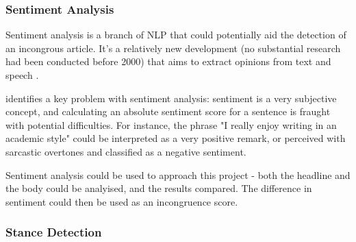 \subsubsection{Sentiment Analysis}
Sentiment analysis is a branch of NLP that could potentially aid the detection of an incongrous article. It's a relatively new development (no substantial research had been conducted before 2000) that aims to extract opinions from text and speech \cite{liu2012}.

 identifies a key problem with sentiment analysis: sentiment is a very subjective concept, and calculating an absolute sentiment score for a sentence is fraught with potential difficulties. For instance, the phrase "I really enjoy writing in an academic style" could be interpreted as a very positive remark, or perceived with sarcastic overtones and classified as a negative sentiment.

Sentiment analysis could be used to approach this project - both the headline and the body could be analyised, and the results compared. The difference in sentiment could then be used as an incongruence score.

\subsubsection{Stance Detection}


